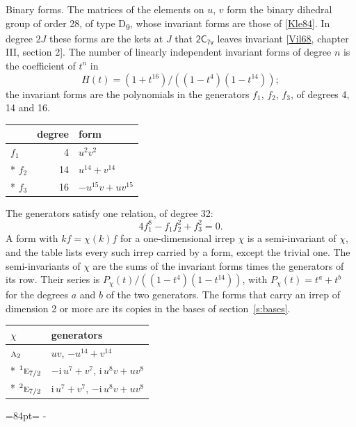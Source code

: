 \documentclass[10pt,a4paper]{article}
\makeatletter
\renewcommand\paragraph{\@startsection{paragraph}{4}{\z@}{1.5ex plus .5ex minus .2ex}{-1em}%
  {\normalfont\small\sffamily\bfseries\color{parttitle}}}
\newcommand{\needspace}[1]{\par\penalty-100\begingroup\dimen0=#1\relax\dimen2=\pagegoal
  \advance\dimen2-\pagetotal\ifdim\dimen0>\dimen2\relax\ifdim\dimen2>0pt\vfil\break\fi\fi
  \endgroup}
\numberwithin{equation}{section}
\newcommand{\grp}[1]{\mathsf{#1}}
\newcommand{\irr}[1]{\text{\normalfont\scshape #1}}
\newcommand{\conjpair}[1]{{}^{#1}}
\newcommand{\iunit}{\mathrm{i}}
\makeatother
\begin{document}
\paragraph{Binary forms.}
The matrices of the elements on $u$, $v$ form the binary dihedral group of order 28, of type D\textsubscript{9}, whose invariant forms are those of [\href{../../../REFERENCES.pdf\#ref.Kle84}{Kle84}]. In degree $2J$ these forms are the kets at $J$ that $\grp{2C_{7v}}$ leaves invariant [\href{../../../REFERENCES.pdf\#ref.Vil68}{Vil68}, chapter III, section 2]. \label{n:head.degree}\label{n:head.form}The number of linearly independent invariant forms of degree $n$ is the coefficient of $t^n$ in
\begin{equation}\label{e:molien}H(t) = (1 + t^{16})/((1-t^{4})(1-t^{14}));\end{equation}
the invariant forms are the polynomials in the generators $f_1$, $f_2$, $f_3$, of degrees 4, 14 and 16.
{\small\begin{longtable}{@{}lrl@{}}\toprule
& degree & form\\\midrule\endhead
\bottomrule\endfoot\endlastfoot
$f_{1}$ & 4 & $u^{2}v^{2}$\\*
$f_{2}$ & 14 & $u^{14} + v^{14}$\\*
$f_{3}$ & 16 & $-u^{15}v + uv^{15}$\\
\bottomrule\end{longtable}}
The generators satisfy one relation, of degree 32:
\begin{equation}\label{e:relation}4f_{1}^{8} - f_{1}f_{2}^{2} + f_{3}^{2} = 0.\end{equation}
A form with $k f = \chi(k) f$ for a one-dimensional irrep $\chi$ is a semi-invariant of $\chi$, and the table lists every such irrep carried by a form, except the trivial one. \label{n:head.generators}The semi-invariants of $\chi$ are the sums of the invariant forms times the generators of its row. Their series is $P_\chi(t)/((1-t^{4})(1-t^{14}))$, with $P_\chi(t) = t^{a} + t^{b}$ for the degrees $a$ and $b$ of the two generators. The forms that carry an irrep of dimension 2 or more are its copies in the bases of section~\ref{s:bases}.
{\small\begin{longtable}{@{}ll@{}}\toprule
$\chi$ & generators\\\midrule\endhead
\bottomrule\endfoot\endlastfoot
$\irr{a}_{2}$ & $uv$, $-u^{14} + v^{14}$\\*
$\conjpair{1}\irr{e}_{7/2}$ & $-\iunit{}\,u^{7} + v^{7}$, $\iunit{}\,u^{8}v + uv^{8}$\\*
$\conjpair{2}\irr{e}_{7/2}$ & $\iunit{}\,u^{7} + v^{7}$, $-\iunit{}\,u^{8}v + uv^{8}$\\
\bottomrule\end{longtable}}
\needspace{84pt}
\end{document}
